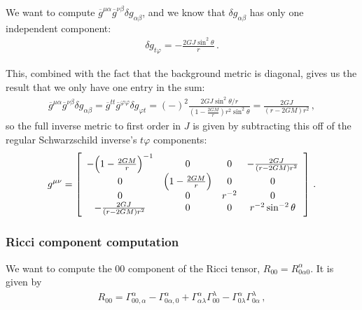 \documentclass[main.tex]{subfiles}
\begin{document}
We want to compute \(\overline{g}^{\mu \alpha } \overline{g}^{\nu \beta } \delta g_{\alpha \beta }\), and we know that \(\delta g_{\alpha \beta } \) has only one independent component: 
%
\begin{align}
  \delta g_{t \varphi } = - \frac{2 GJ  \sin^2\theta }{r}
\,.
\end{align}

This, combined with the fact that the background metric is diagonal, gives us the result that we only have one entry in the sum: 
%
\begin{align}
  \overline{g}^{\mu \alpha } \overline{g}^{\nu \beta } \delta g_{\alpha \beta }
  = \overline{g}^{tt} \overline{g}^{\varphi \varphi }
  \delta g_{\varphi  t}
  =(-)^2 \frac{2GJ \sin^2 \theta /r }{(1 - \frac{2GM}{r}) r^2 \sin^2 \theta }
  = \frac{2GJ}{(r - 2GM) r^2}
  \,,
\end{align}
%
so the  full inverse metric to first order in \(J\) is given by subtracting this off of the regular Schwarzschild inverse's \(t \varphi \) components: 
%
\begin{align}
  g^{\mu \nu } = \left[\begin{array}{cccc}
    -\qty(1 -\frac{2GM}{r})^{-1}  & 0 & 0 & -\frac{2GJ}{(r - 2GM)r^2} \\ 
    0 & \qty(1- \frac{2GM}{r}) & 0 & 0 \\ 
    0 & 0 & r^{-2} & 0 \\ 
    -\frac{2GJ}{(r - 2GM)r^2} & 0 & 0 & r^{-2} \sin^{-2} \theta 
    \end{array}\right]  
\,.
\end{align}

\subsubsection{Ricci component computation}

We want to compute the 00 component of the Ricci tensor, \(R_{00} = R^{\alpha }_{0 \alpha 0}\). It is given by 
%
\begin{align}
  R_{00} = \Gamma^{\alpha }_{00, \alpha }
  - \Gamma^{\alpha }_{0 \alpha, 0}
  + \Gamma^{\alpha }_{\alpha \lambda }
  \Gamma^{\lambda }_{00}
  - \Gamma^{\alpha }_{0\lambda } 
  \Gamma^{\lambda }_{0 \alpha }
\,,
\end{align}
%
\end{document}
